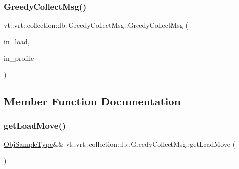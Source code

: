 \subsubsection{\texorpdfstring{Greedy\+Collect\+Msg()}{GreedyCollectMsg()}\hspace{0.1cm}{\footnotesize\ttfamily [2/2]}}
{\footnotesize\ttfamily vt\+::vrt\+::collection\+::lb\+::\+Greedy\+Collect\+Msg\+::\+Greedy\+Collect\+Msg (\begin{DoxyParamCaption}\item[{\hyperlink{structvt_1_1vrt_1_1collection_1_1lb_1_1_greedy_l_b_types_a467f8a79d0785fca5fc95bd5c0f406b9}{Obj\+Sample\+Type} const \&}]{in\+\_\+load,  }\item[{\hyperlink{structvt_1_1vrt_1_1collection_1_1lb_1_1_greedy_l_b_types_a9fe8829bc0c92e88ddf9d149233a54f4}{Load\+Type} const \&}]{in\+\_\+profile }\end{DoxyParamCaption})\hspace{0.3cm}{\ttfamily [inline]}}



\subsection{Member Function Documentation}
\mbox{\label{structvt_1_1vrt_1_1collection_1_1lb_1_1_greedy_collect_msg_a83ba5b561927582a06451672f95999a4}} 
\subsubsection{\texorpdfstring{get\+Load\+Move()}{getLoadMove()}}
{\footnotesize\ttfamily \hyperlink{structvt_1_1vrt_1_1collection_1_1lb_1_1_greedy_l_b_types_a467f8a79d0785fca5fc95bd5c0f406b9}{Obj\+Sample\+Type}\&\& vt\+::vrt\+::collection\+::lb\+::\+Greedy\+Collect\+Msg\+::get\+Load\+Move (\begin{DoxyParamCaption}{ }\end{DoxyParamCaption})\hspace{0.3cm}{\ttfamily [inline]}}

\mbox{\label{structvt_1_1vrt_1_1collection_1_1lb_1_1_greedy_collect_msg_a58eb8dc775f4259076fd9df4df8b496e}} 
